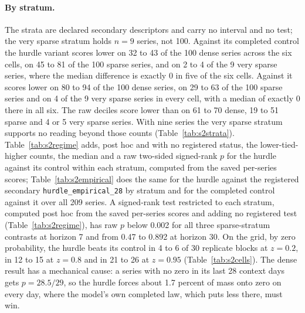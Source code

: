 \paragraph{By stratum.} The strata are declared secondary descriptors and carry no interval and no test;
the very sparse stratum holds $n = 9$ series, not 100. Against its completed control the hurdle variant
scores lower on 32 to 43 of the 100 dense series across the six cells, on 45 to 81 of the 100 sparse
series, and on 2 to 4 of the 9 very sparse series, where the median difference is exactly 0 in five of the
six cells. Against \hc{} it scores lower on 80 to 94 of the 100 dense series, on 29 to 63 of the 100 sparse
series and on 4 of the 9 very sparse series in every cell, with a median of exactly 0 there in all six. The
raw deciles score lower than \lm{} on 61 to 70 dense, 19 to 51 sparse and 4 or 5 very sparse series. With
nine series the very sparse stratum supports no reading beyond those counts (Table~\ref{tab:s2strata}).
Table~\ref{tab:s2regime} adds, post hoc and with no registered status, the lower-tied-higher counts, the
median and a raw two-sided signed-rank $p$ for the hurdle against its control within each stratum, computed
from the saved per-series scores; Table~\ref{tab:s2empirical} does the same for the hurdle against the
registered secondary \texttt{hurdle\_empirical\_28} by stratum and for the completed control against it
over all 209 series. A signed-rank test restricted to each stratum, computed post hoc from the saved per-series scores and
adding no registered test (Table~\ref{tab:s2regime}), has raw $p$ below 0.002 for all three
sparse-stratum contrasts at horizon 7 and from 0.47 to 0.892 at horizon 30. On the grid, by zero
probability, the hurdle beats its control in 4 to 6 of 30 replicate blocks at $z = 0.2$, in 12 to 15 at
$z = 0.8$ and in 21 to 26 at $z = 0.95$ (Table~\ref{tab:s2cells}). The dense result has a mechanical
cause: a series with no zero in its last 28 context days gets $p = 28.5 / 29$, so the hurdle forces about
1.7 percent of mass onto zero on every day, where the model's own completed law, which puts less there,
must win.

